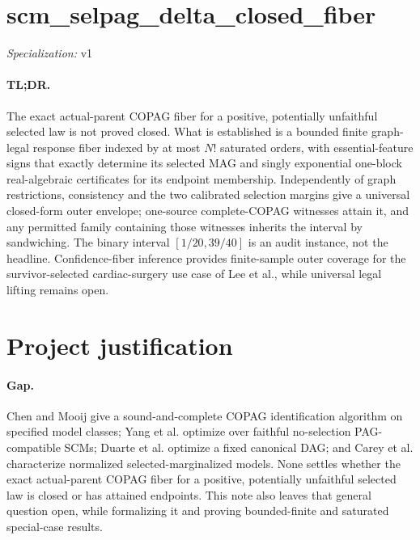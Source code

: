 \documentclass{article}
\begin{document}
\sloppy

\section*{scm\_\allowbreak{}selpag\_\allowbreak{}delta\_\allowbreak{}closed\_\allowbreak{}fiber}

\noindent\textit{Specialization:} v1\par

\paragraph{TL;DR.} The exact actual-parent COPAG fiber for a positive, potentially unfaithful selected law is not proved closed.  What is established is a bounded finite graph-legal response fiber indexed by at most \(N!\) saturated orders, with essential-feature signs that exactly determine its selected MAG and singly exponential one-block real-algebraic certificates for its endpoint membership.  Independently of graph restrictions, consistency and the two calibrated selection margins give a universal closed-form outer envelope; one-source complete-COPAG witnesses attain it, and any permitted family containing those witnesses inherits the interval by sandwiching.  The binary interval \(\left[1/20,39/40\right]\) is an audit instance, not the headline.  Confidence-fiber inference provides finite-sample outer coverage for the survivor-selected cardiac-surgery use case of Lee et al., while universal legal lifting remains open.

\section{Project justification}

\paragraph{Gap.} Chen and Mooij give a sound-and-complete COPAG identification algorithm on specified model classes; Yang et al. optimize over faithful no-selection PAG-compatible SCMs; Duarte et al. optimize a fixed canonical DAG; and Carey et al. characterize normalized selected-marginalized models. None settles whether the exact actual-parent COPAG fiber for a positive, potentially unfaithful selected law is closed or has attained endpoints. This note also leaves that general question open, while formalizing it and proving bounded-finite and saturated special-case results.
\end{document}
